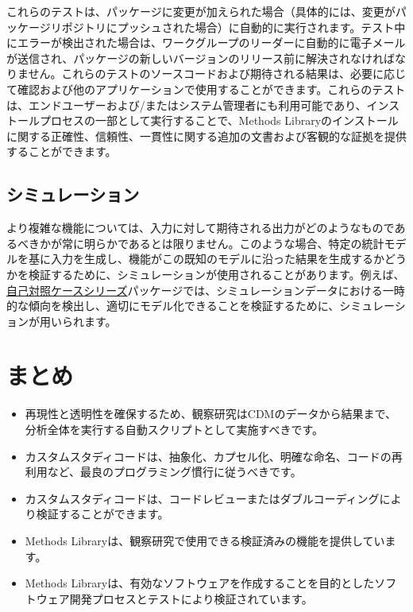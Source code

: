 \documentclass[
  11pt]{book}
\makeatletter
\providecommand{\tightlist}{%
  \setlength{\itemsep}{0pt}\setlength{\parskip}{0pt}}
\newenvironment{kframe}{%
\medskip{}
\setlength{\fboxsep}{.8em}
 \def\at@end@of@kframe{}%
 \ifinner\ifhmode%
  \def\at@end@of@kframe{\end{minipage}}%
  \begin{minipage}{\columnwidth}%
 \fi\fi%
 \def\FrameCommand##1{\hskip\@totalleftmargin \hskip-\fboxsep
 \colorbox{myShadeColor}{##1}\hskip-\fboxsep
     \hskip-\linewidth \hskip-\@totalleftmargin \hskip\columnwidth}%
 \MakeFramed {\advance\hsize-\width
   \@totalleftmargin\z@ \linewidth\hsize
   \@setminipage}}%
 {\par\unskip\endMakeFramed%
 \at@end@of@kframe}
\newenvironment{rmdblock}[1]
  {
  \begin{itemize}
  \renewcommand{\labelitemi}{
    \raisebox{-.7\height}[0pt][0pt]{
      {\setkeys{Gin}{width=3em,keepaspectratio}\texttt{[image: images/\#1]}}
    }
  }
  \setlength{\fboxsep}{1em}
  \begin{kframe}
  \item
  }
  {
  \end{kframe}
  \end{itemize}
  }
\newenvironment{rmdsummary}
  {\begin{rmdblock}{summary}}
  {\end{rmdblock}}
\theoremstyle{definition}
\theoremstyle{definition}
\theoremstyle{definition}
\theoremstyle{definition}
\theoremstyle{remark}
\makeatother
\begin{document}
これらのテストは、パッケージに変更が加えられた場合（具体的には、変更がパッケージリポジトリにプッシュされた場合）に自動的に実行されます。テスト中にエラーが検出された場合は、ワークグループのリーダーに自動的に電子メールが送信され、パッケージの新しいバージョンのリリース前に解決されなければなりません。これらのテストのソースコードおよび期待される結果は、必要に応じて確認および他のアプリケーションで使用することができます。これらのテストは、エンドユーザーおよび/またはシステム管理者にも利用可能であり、インストールプロセスの一部として実行することで、Methods Libraryのインストールに関する正確性、信頼性、一貫性に関する追加の文書および客観的な証拠を提供することができます。

\subsection{シミュレーション}\label{ux30b7ux30dfux30e5ux30ecux30fcux30b7ux30e7ux30f3}

より複雑な機能については、入力に対して期待される出力がどのようなものであるべきかが常に明らかであるとは限りません。このような場合、特定の統計モデルを基に入力を生成し、機能がこの既知のモデルに沿った結果を生成するかどうかを検証するために、シミュレーションが使用されることがあります。例えば、\href{https://ohdsi.github.io/SelfControlledCaseSeries/}{自己対照ケースシリーズ}パッケージでは、シミュレーションデータにおける一時的な傾向を検出し、適切にモデル化できることを検証するために、シミュレーションが用いられます。

\section{まとめ}\label{ux307eux3068ux3081-13}

\begin{rmdsummary}
\begin{itemize}
\tightlist
\item
  再現性と透明性を確保するため、観察研究はCDMのデータから結果まで、分析全体を実行する自動スクリプトとして実施すべきです。
\item
  カスタムスタディコードは、抽象化、カプセル化、明確な命名、コードの再利用など、最良のプログラミング慣行に従うべきです。
\item
  カスタムスタディコードは、コードレビューまたはダブルコーディングにより検証することができます。
\item
  Methods Libraryは、観察研究で使用できる検証済みの機能を提供しています。
\item
  Methods Libraryは、有効なソフトウェアを作成することを目的としたソフトウェア開発プロセスとテストにより検証されています。
\end{itemize}
\end{rmdsummary}
\end{document}

